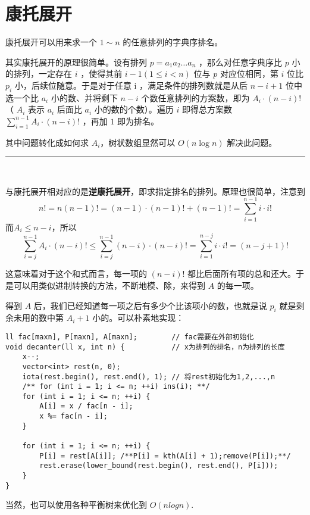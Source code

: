 \section{康托展开}
\par \noindent 康托展开可以用来求一个 $1\sim n$ 的任意排列的字典序排名。
~\\
\par \noindent 其实康托展开的原理很简单。设有排列 $p=a_1a_2…a_n$ ，那么对任意字典序比 $p$ 小的排列，一定存在 $i$ ，使得其前 $i−1 (1\leq i<n)$ 位与 $p$ 对应位相同，第 $i$ 位比 $p_i$ 小，后续位随意。于是对于任意 i ，满足条件的排列数就是从后 $n−i+1$ 位中选一个比 $a_i$ 小的数、并将剩下 $n−i$ 个数任意排列的方案数，即为 $A_i\cdot(n−i)!$ （ $A_i$ 表示 $a_i$ 后面比 $a_i$ 小的数的个数）。遍历 $i$ 即得总方案数$\sum_{i=1}^{n−1}A_i\cdot(n−i)!$ ，再加 $1$ 即为排名。
~\\
\par \noindent 其中问题转化成如何求 $A_i$，树状数组显然可以 $O(n\log n)$ 解决此问题。 
\par \noindent \rule[-10pt]{17.5cm}{0.05em}
~\\
\par \noindent 与康托展开相对应的是\textbf{逆康托展开}，即求指定排名的排列。原理也很简单，注意到
$$
n!=n(n-1)!=(n-1)\cdot(n-1)! + (n-1)! = \sum_{i=1}^{n-1}i\cdot i!
$$
而$A_i\leq n-i$，所以
$$
\sum_{i=j}^{n-1}A_i\cdot (n-i)!\leq\sum_{i=j}^{n-1}(n-i)\cdot (n-i)!=\sum_{i=1}^{n-j}i\cdot i!=(n-j+1)!
$$
\par \noindent 这意味着对于这个和式而言，每一项的 $(n−i)!$ 都比后面所有项的总和还大。于是可以用类似进制转换的方法，不断地模、除，来得到 $A$ 的每一项。
~\\
\par \noindent 得到 $A$ 后，我们已经知道每一项之后有多少个比该项小的数，也就是说 $p_i$ 就是剩余未用的数中第 $A_{i}+1$ 小的。可以朴素地实现：
\begin{verbatim}
ll fac[maxn], P[maxn], A[maxn];        // fac需要在外部初始化
void decanter(ll x, int n) {           // x为排列的排名，n为排列的长度
    x--;
    vector<int> rest(n, 0);
    iota(rest.begin(), rest.end(), 1); // 将rest初始化为1,2,...,n
    /** for (int i = 1; i <= n; ++i) ins(i); **/
    for (int i = 1; i <= n; ++i) {
        A[i] = x / fac[n - i];
        x %= fac[n - i];
    }

    for (int i = 1; i <= n; ++i) {
        P[i] = rest[A[i]]; /**P[i] = kth(A[i] + 1);remove(P[i]);**/
        rest.erase(lower_bound(rest.begin(), rest.end(), P[i]));
    }
}
\end{verbatim}

\par \noindent 当然，也可以使用各种平衡树来优化到 $O(nlog⁡n) $.